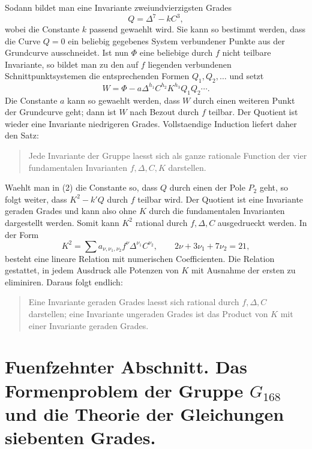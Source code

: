 \documentclass[11pt]{article}
\begin{document}
Sodann bildet man eine Invariante zweiundvierzigsten Grades
\begin{equation}
Q=\Delta^7-kC^3,
\tag{2}
\end{equation}
wobei die Constante \(k\) passend gewaehlt wird. Sie kann so bestimmt werden, dass die Curve \(Q=0\) ein beliebig gegebenes System verbundener Punkte aus der Grundcurve ausschneidet. Ist nun \(\Phi\) eine beliebige durch \(f\) nicht teilbare Invariante, so bildet man zu den auf \(f\) liegenden verbundenen Schnittpunktsystemen die entsprechenden Formen \(Q_1,Q_2,\ldots\) und setzt
\begin{equation}
W=\Phi-a\Delta^{h_1}C^{h_2}K^{h_3}Q_1Q_2\cdots.
\end{equation}
Die Constante \(a\) kann so gewaehlt werden, dass \(W\) durch einen weiteren Punkt der Grundcurve geht; dann ist \(W\) nach Bezout durch \(f\) teilbar. Der Quotient ist wieder eine Invariante niedrigeren Grades. Vollstaendige Induction liefert daher den Satz:
\begin{quote}
Jede Invariante der Gruppe laesst sich als ganze rationale Function der vier fundamentalen Invarianten \(f,\Delta,C,K\) darstellen.
\end{quote}

Waehlt man in (2) die Constante so, dass \(Q\) durch einen der Pole \(P_2\) geht, so folgt weiter, dass \(K^2-k'Q\) durch \(f\) teilbar wird. Der Quotient ist eine Invariante geraden Grades und kann also ohne \(K\) durch die fundamentalen Invarianten dargestellt werden. Somit kann \(K^2\) rational durch \(f,\Delta,C\) ausgedrueckt werden. In der Form
\begin{equation}
K^2=\sum a_{\nu,\nu_1,\nu_2} f^\nu\Delta^{\nu_1}C^{\nu_2},
\qquad
2\nu+3\nu_1+7\nu_2=21,
\tag{3}
\end{equation}
besteht eine lineare Relation mit numerischen Coefficienten. Die Relation gestattet, in jedem Ausdruck alle Potenzen von \(K\) mit Ausnahme der ersten zu eliminiren. Daraus folgt endlich:
\begin{quote}
Eine Invariante geraden Grades laesst sich rational durch \(f,\Delta,C\) darstellen; eine Invariante ungeraden Grades ist das Product von \(K\) mit einer Invariante geraden Grades.
\end{quote}

\clearpage



\section*{Fuenfzehnter Abschnitt. Das Formenproblem der Gruppe \(G_{168}\) und die Theorie der Gleichungen siebenten Grades.}
\end{document}
